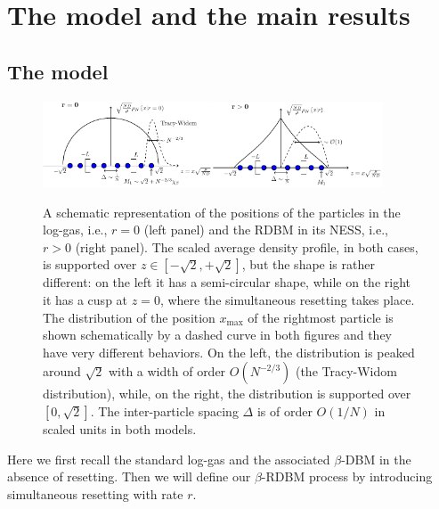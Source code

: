 \documentclass[onecolumn,superscriptaddress,
 amsmath,amssymb,
 aps,
 prd,
]{revtex4-1}
\begin{document}
\section{The model and the main results}


\subsection{The model} \label{sec:intro-model}

\begin{figure}
\centering
\includegraphics[width = 0.45\textwidth]{free_gas.pdf}\hspace*{1.5cm}\includegraphics[width = 0.45\textwidth]{reset_gas.pdf}
\caption{A schematic representation of the positions of the particles in the log-gas, i.e., $r=0$ (left panel) and the RDBM in its NESS, i.e., $r>0$ (right panel). 
The scaled average density profile, in both cases, is supported over $z \in [-\sqrt{2},+\sqrt{2}]$, but the shape is rather different: 
on the left it has a semi-circular shape, while on the right it has a cusp at $z=0$, where the simultaneous resetting takes place. The distribution of the 
position $x_{\max}$ of the rightmost particle is shown schematically by a dashed curve in both figures and they have very different behaviors. On the left, the distribution is peaked around $\sqrt{2}$ with a width of order $O(N^{-2/3})$ (the Tracy-Widom distribution), while, on the right, the distribution is supported over $[0,\sqrt{2}]$. The inter-particle spacing $\Delta$ is of order $O(1/N)$ in scaled units in both models.} \label{fig:sketch}
\end{figure}



Here we first recall the standard log-gas and the associated $\beta$-DBM in the absence of resetting. Then we will define our $\beta$-RDBM process 
by introducing simultaneous resetting with rate $r$. 
\end{document}
